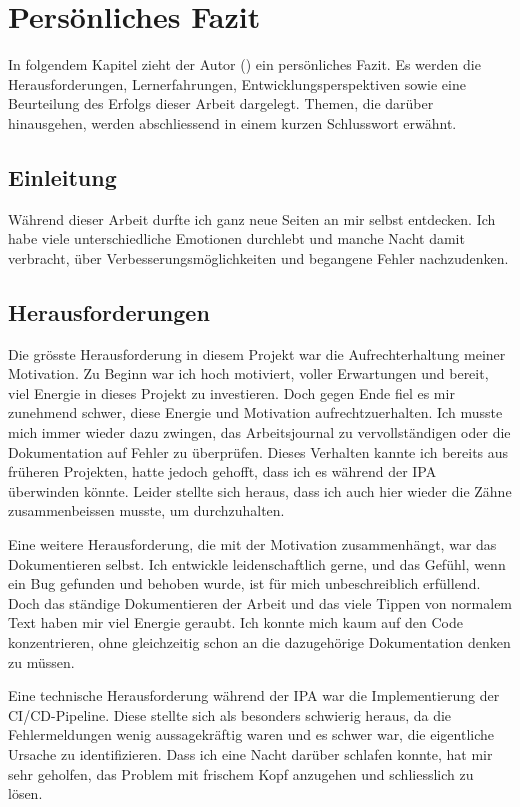 \chapter{Persönliches Fazit}
\vspace{-3em}
In folgendem Kapitel zieht der Autor (\kandidat) ein persönliches Fazit. Es werden die Herausforderungen, Lernerfahrungen, Entwicklungsperspektiven sowie eine Beurteilung des Erfolgs dieser Arbeit dargelegt. Themen, die darüber hinausgehen, werden abschliessend in einem kurzen Schlusswort erwähnt.

\section{Einleitung}
Während dieser Arbeit durfte ich ganz neue Seiten an mir selbst entdecken. Ich habe viele unterschiedliche Emotionen durchlebt und manche Nacht damit verbracht, über Verbesserungsmöglichkeiten und begangene Fehler nachzudenken.

\section{Herausforderungen}
Die grösste Herausforderung in diesem Projekt war die Aufrechterhaltung meiner Motivation. Zu Beginn war ich hoch motiviert, voller Erwartungen und bereit, viel Energie in dieses Projekt zu investieren. Doch gegen Ende fiel es mir zunehmend schwer, diese Energie und Motivation aufrechtzuerhalten. Ich musste mich immer wieder dazu zwingen, das Arbeitsjournal zu vervollständigen oder die Dokumentation auf Fehler zu überprüfen. Dieses Verhalten kannte ich bereits aus früheren Projekten, hatte jedoch gehofft, dass ich es während der IPA überwinden könnte. Leider stellte sich heraus, dass ich auch hier wieder die Zähne zusammenbeissen musste, um durchzuhalten.

Eine weitere Herausforderung, die mit der Motivation zusammenhängt, war das Dokumentieren selbst. Ich entwickle leidenschaftlich gerne, und das Gefühl, wenn ein Bug gefunden und behoben wurde, ist für mich unbeschreiblich erfüllend. Doch das ständige Dokumentieren der Arbeit und das viele Tippen von normalem Text haben mir viel Energie geraubt. Ich konnte mich kaum auf den Code konzentrieren, ohne gleichzeitig schon an die dazugehörige Dokumentation denken zu müssen.

Eine technische Herausforderung während der IPA war die Implementierung der CI/CD-Pipeline. Diese stellte sich als besonders schwierig heraus, da die Fehlermeldungen wenig aussagekräftig waren und es schwer war, die eigentliche Ursache zu identifizieren. Dass ich eine Nacht darüber schlafen konnte, hat mir sehr geholfen, das Problem mit frischem Kopf anzugehen und schliesslich zu lösen.

